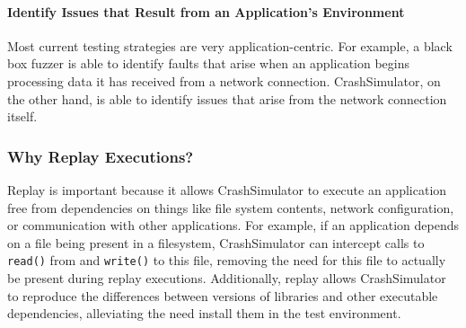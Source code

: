         \paragraph{Identify Issues that Result from an Application's Environment}

        Most current testing strategies are very application-centric.  For
        example, a black box fuzzer is able to identify faults that arise when
        an application begins processing data it has received from a network
        connection. CrashSimulator, on the other hand, is able to identify
        issues that arise from the network connection itself.

    \subsubsection{Why Replay Executions?}

        Replay is important because it allows CrashSimulator to execute an
        application free from dependencies on things like file system contents,
        network configuration, or communication with other applications.  For
        example, if an application depends on a file being present in a filesystem,
        CrashSimulator can intercept calls to {\tt read()} from and {\tt write()} to
        this file, removing the need for this file to actually be present during
        replay executions. Additionally, replay allows CrashSimulator to reproduce
        the differences between versions of libraries and other executable
        dependencies, alleviating the need install them in the test environment.



